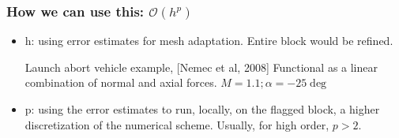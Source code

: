 \documentclass{beamer}
\begin{document}
\begin{frame}%
\frametitle{How we can use this: \LARGE{$\mathcal{O}(h^p)$}}

\scriptsize
\begin{itemize}
\vspace{-25pt}
\item h: using error estimates for mesh adaptation. Entire block would be refined.
\begin{minipage}[t][0.7\textheight]{0.95\textwidth}
\vspace{-10pt}
\begin{exampleblock}{Launch abort vehicle example, [Nemec et al, 2008]}
\tiny
Functional as a linear combination of normal and axial forces. $M = 1.1; \alpha=-25\deg$
\vspace{-10pt}

\begin{figure}
\label{fig:LAVone}
\centering
{}
\end{figure}
\end{exampleblock}
\end{minipage}
\vspace{0pt}
\item p: using the error estimates to run, locally, on the flagged block, a higher discretization of the numerical scheme. Usually, for high order,  $ p > 2 $.


\end{itemize}
\end{frame}
\end{document}
